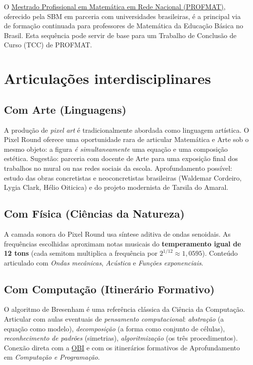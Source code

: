 \documentclass[12pt,a4paper]{scrartcl}
\newcommand{\acc}[1]{\textcolor{accent}{\textbf{#1}}}
\begin{document}
O \href{https://www.profmat-sbm.org.br/}{Mestrado Profissional em Matemática em Rede Nacional (PROFMAT)}, oferecido pela SBM em parceria com universidades brasileiras, é a principal via de formação continuada para professores de Matemática da Educação Básica no Brasil. Esta sequência pode servir de base para um Trabalho de Conclusão de Curso (TCC) de PROFMAT.

\section{Articulações interdisciplinares}\label{sec:interdisc}

\subsection{Com Arte (Linguagens)}
A produção de \emph{pixel art} é tradicionalmente abordada como linguagem artística. O Pixel Round oferece uma oportunidade rara de articular Matemática e Arte sob o mesmo objeto: a figura \emph{é simultaneamente} uma equação e uma composição estética. Sugestão: parceria com docente de Arte para uma exposição final dos trabalhos no mural ou nas redes sociais da escola. Aprofundamento possível: estudo das obras concretistas e neoconcretistas brasileiras (Waldemar Cordeiro, Lygia Clark, Hélio Oiticica) e do projeto modernista de Tarsila do Amaral.

\subsection{Com Física (Ciências da Natureza)}
A camada sonora do Pixel Round usa síntese aditiva de ondas senoidais. As frequências escolhidas aproximam notas musicais do \acc{temperamento igual de 12 tons} (cada semitom multiplica a frequência por $2^{1/12} \approx 1{,}0595$). Conteúdo articulado com \emph{Ondas mecânicas}, \emph{Acústica} e \emph{Funções exponenciais}.

\subsection{Com Computação (Itinerário Formativo)}
O algoritmo de Bresenham é uma referência clássica da Ciência da Computação. Articular com aulas eventuais de \emph{pensamento computacional}: \emph{abstração} (a equação como modelo), \emph{decomposição} (a forma como conjunto de células), \emph{reconhecimento de padrões} (simetrias), \emph{algoritmização} (os três procedimentos). Conexão direta com a \hyperref[sec:obmep]{OBI} e com os itinerários formativos de Aprofundamento em \emph{Computação e Programação}.
\end{document}
